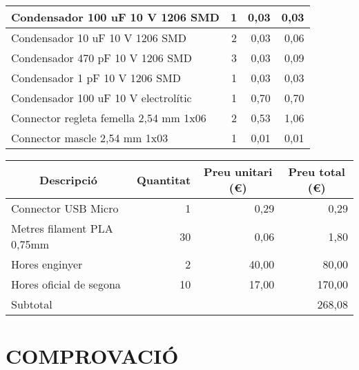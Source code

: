 \begin{table}[H]
\begin{center}
\begin{tabularx} {\textwidth} {|X|r|r|r|}
    Condensador 100 uF 10 V 1206 SMD & 1     & 0,03  & 0,03 \\ \hline
    Condensador 10 uF 10 V 1206 SMD & 2     & 0,03  & 0,06 \\ \hline
    Condensador 470 pF 10 V 1206 SMD & 3     & 0,03  & 0,09 \\ \hline
    Condensador 1 pF 10 V 1206 SMD & 1     & 0,03  & 0,03 \\ \hline
    Condensador 100 uF 10 V electrolític & 1     & 0,70  & 0,70 \\ \hline
    Connector regleta femella 2,54 mm 1x06 & 2     & 0,53  & 1,06 \\ \hline
    Connector mascle 2,54 mm 1x03 & 1     & 0,01  & 0,01 \\ \hline

    \end{tabularx}%
  \end{center}
  \label{tab:addlabel}%
\end{table}%
%

\begin{table}[H]
  \begin{center}
    \begin{tabularx} {\textwidth} {|X|r|r|r|} \hline
  \multicolumn{1}{|c|}{Descripció} &  \multicolumn{1}{c|}{Quantitat} & \multicolumn{1}{c|}{Preu unitari (€)} &  \multicolumn{1}{c|}{Preu total (€)}\\ \hline \hline

    Connector USB Micro & 1     & 0,29  & 0,29 \\ \hline
    Metres filament PLA 0,75mm & 30    & 0,06  & 1,80 \\ \hline
    Hores enginyer & 2     & 40,00 & 80,00 \\ \hline
    Hores oficial de segona & 10    & 17,00 & 170,00 \\ \hline \hline
    Subtotal &       &       & 268,08 \\ \hline
    \end{tabularx}%
  \end{center}
  \label{tab:addlabel}%
\end{table}%

\section{\uppercase{Comprovació}}

